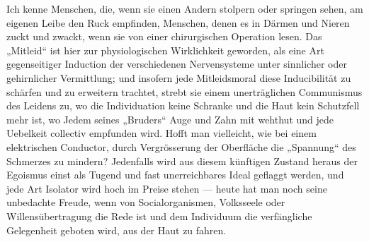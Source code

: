 Ich kenne Menschen, die, wenn sie einen Andern stolpern oder springen sehen, am eigenen Leibe den Ruck empfinden, Menschen, denen es in Därmen und Nieren zuckt und zwackt, wenn sie von einer chirurgischen Operation lesen. Das „Mitleid“ ist hier zur physiologischen Wirklichkeit geworden, als eine Art gegenseitiger Induction der verschiedenen Nervensysteme unter sinnlicher oder gehirnlicher Vermittlung; und insofern jede Mitleidsmoral diese Inducibilität zu schärfen und zu erweitern trachtet, strebt sie einem unerträglichen Communismus des Leidens zu, wo die Individuation keine Schranke und die Haut kein Schutzfell mehr ist, wo Jedem seines „Bruders“ Auge und Zahn mit wehthut und jede Uebelkeit collectiv empfunden wird. Hofft man vielleicht, wie bei einem elektrischen Conductor, durch Vergrösserung der Oberfläche die „Spannung“ des Schmerzes zu mindern? Jedenfalls wird aus diesem künftigen Zustand heraus der Egoismus einst als Tugend und fast unerreichbares Ideal geflaggt werden, und jede Art Isolator wird hoch im Preise stehen — heute hat man noch seine unbedachte Freude, wenn von Socialorganismen, Volksseele oder Willensübertragung die Rede ist und dem Individuum die verfängliche Gelegenheit geboten wird, aus der Haut zu fahren.
\par

